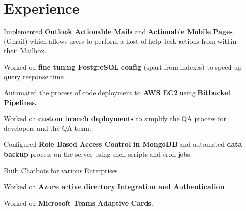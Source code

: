 \documentclass{deedy-resume-openfont}
\begin{document}
\hfill
\begin{minipage}[t]{0.66\textwidth} 


\section{Experience}

\vspace{\topsep} %
\begin{tightemize}
\item Implemented \textbf{Outlook Actionable Mails} and \textbf{Actionable Mobile Pages} (Gmail) which allows users to perform a host of help desk actions from within their Mailbox.
\item Worked on \textbf{fine tuning PostgreSQL config} (apart from indexes) to speed up query response time
\end{tightemize}
\sectionsep

\begin{tightemize}
\item Automated the process of code deployment to \textbf{AWS EC2} using \textbf{Bitbucket Pipelines.}
\item Worked on \textbf{custom branch deployments} to simplify the QA process for developers and the QA team.
\item Configured \textbf{Role Based Access Control in MongoDB} and automated
\textbf{data backup} process on the server using shell scripts and cron jobs.
\end{tightemize}
\sectionsep

\descript{  }
\begin{tightemize}
\item Built Chatbots for various Enterprises
\item Worked on \textbf{Azure active directory Integration and Authentication}
\item Worked on \textbf{Microsoft Teams Adaptive Cards}.
\end{tightemize}


\end{minipage}
\end{document}
